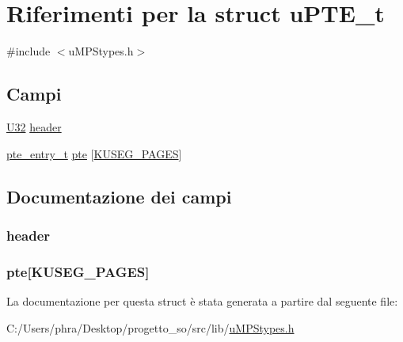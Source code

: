 \hypertarget{structu_p_t_e__t}{\section{Riferimenti per la struct u\-P\-T\-E\-\_\-t}
\label{structu_p_t_e__t}
}


{\ttfamily \#include $<$u\-M\-P\-Stypes.\-h$>$}

\subsection*{Campi}
\begin{DoxyCompactItemize}
\item 
\hyperlink{base_8h_ac3df7cf3c8cb172a588adec881447d68}{U32} \hyperlink{structu_p_t_e__t_a45eed61436d7fec550ec1071e528d577}{header}
\item 
\hyperlink{structpte__entry__t}{pte\-\_\-entry\-\_\-t} \hyperlink{structu_p_t_e__t_ad46c1ca2251ccf015b88b42ed2965665}{pte} \mbox{[}\hyperlink{const_8h_a343972254f8fab5a6141ba018d1ed7a2}{K\-U\-S\-E\-G\-\_\-\-P\-A\-G\-E\-S}\mbox{]}
\end{DoxyCompactItemize}


\subsection{Documentazione dei campi}
\hypertarget{structu_p_t_e__t_a45eed61436d7fec550ec1071e528d577}{
\subsubsection[{header}]{ header}}\label{structu_p_t_e__t_a45eed61436d7fec550ec1071e528d577}
\hypertarget{structu_p_t_e__t_ad46c1ca2251ccf015b88b42ed2965665}{
\subsubsection[{pte}]{ pte\mbox{[}{\bf K\-U\-S\-E\-G\-\_\-\-P\-A\-G\-E\-S}\mbox{]}}}\label{structu_p_t_e__t_ad46c1ca2251ccf015b88b42ed2965665}


La documentazione per questa struct è stata generata a partire dal seguente file\-:\begin{DoxyCompactItemize}
\item 
C\-:/\-Users/phra/\-Desktop/progetto\-\_\-so/src/lib/\hyperlink{u_m_p_stypes_8h}{u\-M\-P\-Stypes.\-h}\end{DoxyCompactItemize}
